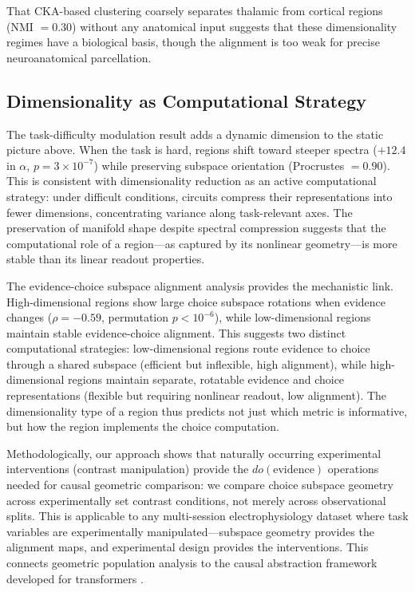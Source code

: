 \documentclass{article}
\begin{document}
That CKA-based clustering coarsely separates thalamic from cortical regions (NMI $= 0.30$) without any anatomical input suggests that these dimensionality regimes have a biological basis, though the alignment is too weak for precise neuroanatomical parcellation.

\subsection{Dimensionality as Computational Strategy}

The task-difficulty modulation result adds a dynamic dimension to the static picture above. When the task is hard, regions shift toward steeper spectra ($+12.4$ in $\alpha$, $p = 3 \times 10^{-7}$) while preserving subspace orientation (Procrustes $= 0.90$). This is consistent with dimensionality reduction as an active computational strategy: under difficult conditions, circuits compress their representations into fewer dimensions, concentrating variance along task-relevant axes. The preservation of manifold shape despite spectral compression suggests that the computational role of a region---as captured by its nonlinear geometry---is more stable than its linear readout properties.

The evidence-choice subspace alignment analysis provides the mechanistic link. High-dimensional regions show large choice subspace rotations when evidence changes ($\rho = -0.59$, permutation $p < 10^{-6}$), while low-dimensional regions maintain stable evidence-choice alignment. This suggests two distinct computational strategies: low-dimensional regions route evidence to choice through a shared subspace (efficient but inflexible, high alignment), while high-dimensional regions maintain separate, rotatable evidence and choice representations (flexible but requiring nonlinear readout, low alignment). The dimensionality type of a region thus predicts not just which metric is informative, but how the region implements the choice computation.

Methodologically, our approach shows that naturally occurring experimental interventions (contrast manipulation) provide the $do(\text{evidence})$ operations needed for causal geometric comparison: we compare choice subspace geometry across experimentally set contrast conditions, not merely across observational splits. This is applicable to any multi-session electrophysiology dataset where task variables are experimentally manipulated---subspace geometry provides the alignment maps, and experimental design provides the interventions. This connects geometric population analysis to the causal abstraction framework developed for transformers \citep{geiger2024causal}.
\end{document}
